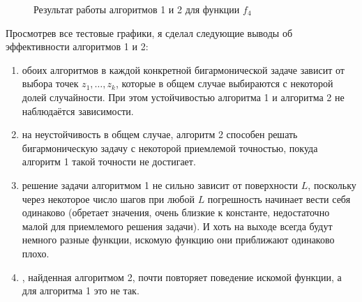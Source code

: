 \documentclass[a4paper, 12pt]{article}
\begin{document}
            \begin{figure}[h!]
              \caption{Результат работы алгоритмов 1 и 2 для функции $f_4$}
              \label{bg2}
            \end{figure}


Просмотрев все тестовые графики, я сделал следующие выводы об эффективности алгоритмов 1 и 2:
\begin{enumerate}
  \item { обоих алгоритмов в каждой конкретной бигармонической задаче зависит от выбора точек $z_1, \dots, z_k$}, которые в общем случае выбираются с некоторой долей случайности. При этом { устойчивостью алгоритма 1 и алгоритма 2 не наблюдаётся зависимости}.
  \item { на неустойчивость в общем случае, алгоритм 2 способен решать бигармоническую задачу с некоторой приемлемой точностью, покуда алгоритм 1 такой точности не достигает}.
  \item { решение задачи алгоритмом 1 не сильно зависит от поверхности $L$, поскольку через некоторое число шагов при любой $L$ погрешность начинает вести себя одинаково} (обретает значения, очень близкие к константе, недостаточно малой для приемлемого решения задачи). И хоть на выходе всегда будут немного разные функции, искомую функцию они приближают одинаково плохо.
  \item {, найденная алгоритмом 2, почти повторяет поведение искомой функции, а для алгоритма 1 это не так}.
\end{enumerate}
\end{document}
